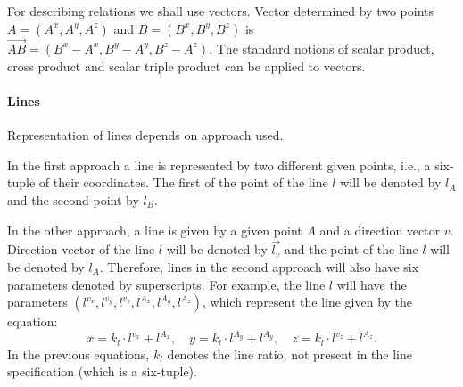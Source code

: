\documentclass[final,1p,times,authoryear]{elsarticle}
\begin{document}
For describing relations we shall use vectors. Vector determined by
two points $A = (A^x, A^y, A^z)$ and $B = (B^x, B^y, B^z)$ is
$\overrightarrow{AB} = (B^x- A^x, B^y - A^y, B^z - A^z)$. The standard
notions of scalar product, cross product and scalar triple product can
be applied to vectors.


\paragraph{Lines}

Representation of lines depends on approach used.

In the first approach a line is represented by two different given
points, i.e., a six-tuple of their coordinates. The first of the point
of the line $l$ will be denoted by $l_A$ and the second point by
$l_B$.

In the other approach, a line is given by a given point $A$ and a
direction vector $v$. Direction vector of the line $l$ will be denoted
by $\overrightarrow{l_v}$ and the point of the line $l$ will be
denoted by $l_A$. Therefore, lines in the second approach will also
have six parameters denoted by superscripts. For example, the line $l$
will have the parameters $(l^{v_x}, l^{v_y}, l^{v_z}, l^{A_x},
l^{A_y}, l^{A_z})$, which represent the line given by the equation:
$$x = k_l\cdot l^{v_x} + l^{A_x},\quad y = k_l\cdot l^{A_y} +
l^{A_y},\quad z = k_l\cdot l^{v_z} + l^{A_z}.$$
In the previous equations, $k_l$ denotes the line ratio, not present
in the line specification (which is a six-tuple).
\end{document}
